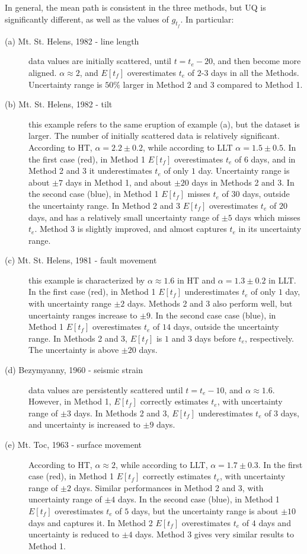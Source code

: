 \documentclass{article}
\begin{document}
In general, the mean path is consistent in the three methods, but UQ is significantly different, as well as the values of $g_{t_f}$. In particular: \begin{description}
  \item[(a) Mt. St. Helens, 1982 - line length] data values are initially scattered, until $t = t_e - 20$, and then become more aligned. $\alpha \approx 2$, and $E[t_f]$ overestimates $t_e$ of $2$-$3$ days in all the Methods. Uncertainty range is $50\%$ larger in Method 2 and 3 compared to Method 1.
  \item[(b) Mt. St. Helens, 1982 - tilt] this example refers to the same eruption of example (a), but the dataset is larger. The number of initially scattered data is relatively significant. According to HT, $\alpha= 2.2\pm 0.2$, while according to LLT $\alpha= 1.5\pm 0.5$. In the first case (red), in Method 1 $E[t_f]$ overestimates $t_e$ of $6$ days, and in Method 2 and 3 it underestimates $t_e$ of only $1$ day. Uncertainty range is about $\pm 7$ days in Method 1, and about $\pm 20$ days in Methods 2 and 3. In the second case (blue), in Method 1 $E[t_f]$ misses $t_e$ of $30$ days, outside the uncertainty range. In Method 2 and 3 $E[t_f]$ overestimates $t_e$ of $20$ days, and has a relatively small uncertainty range of $\pm 5$ days which misses $t_e$. Method 3 is slightly improved, and almost captures $t_e$ in its uncertainty range.
  \item[(c) Mt. St. Helens, 1981 - fault movement] this example is characterized by $\alpha \approx 1.6$ in HT and $\alpha = 1.3\pm 0.2$ in LLT. In the first case (red), in Method 1 $E[t_f]$ underestimates $t_e$ of only $1$ day, with uncertainty range $\pm 2$ days. Methods 2 and 3 also perform well, but uncertainty ranges increase to $\pm 9$. In the second case case (blue), in Method 1 $E[t_f]$ overestimates $t_e$ of $14$ days, outside the uncertainty range. In Methods 2 and 3, $E[t_f]$ is $1$ and $3$ days before $t_e$, respectively. The uncertainty is above $\pm 20$ days.
  \item[(d) Bezymyanny, 1960 - seismic strain] data values are persistently scattered until $t = t_e - 10$, and $\alpha \approx 1.6$. However, in Method 1, $E[t_f]$ correctly estimates $t_e$, with uncertainty range of $\pm 3$ days. In Methods 2 and 3, $E[t_f]$ underestimates $t_e$ of $3$ days, and uncertainty is increased to $\pm 9$ days.
  \item[(e) Mt. Toc, 1963 - surface movement] According to HT, $\alpha \approx 2$, while according to LLT, $\alpha= 1.7\pm0.3$. In the first case (red), in Method 1 $E[t_f]$ correctly estimates $t_e$, with uncertainty range of $\pm 2$ days. Similar performances in Method 2 and 3, with uncertainty range of $\pm 4$ days. In the second case (blue), in Method 1 $E[t_f]$ overestimates $t_e$ of $5$ days, but the uncertainty range is about $\pm 10$ days and captures it. In Method 2 $E[t_f]$ overestimates $t_e$ of $4$ days and uncertainty is reduced to $\pm 4$ days. Method 3 gives very similar results to Method 1.

\end{description}
\end{document}
